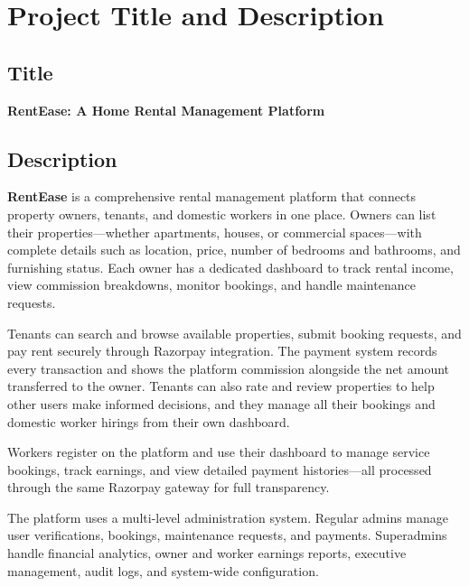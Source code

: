 \documentclass[12pt,a4paper]{article}
\begin{document}
\newpage
\tableofcontents
\newpage

\section{Project Title and Description}

\subsection*{Title}
\begin{tcolorbox}[enhanced, colback=ctxBlue!30!white, colframe=primary,
  arc=4pt, boxrule=1pt, left=10pt, right=10pt, top=8pt, bottom=8pt]
  {\large\bfseries\color{primary} RentEase: A Home Rental Management Platform}
\end{tcolorbox}

\subsection*{Description}

\textbf{RentEase} is a comprehensive rental management platform that connects property owners, tenants, and domestic workers in one place. Owners can list their properties---whether apartments, houses, or commercial spaces---with complete details such as location, price, number of bedrooms and bathrooms, and furnishing status. Each owner has a dedicated dashboard to track rental income, view commission breakdowns, monitor bookings, and handle maintenance requests.

Tenants can search and browse available properties, submit booking requests, and pay rent securely through Razorpay integration. The payment system records every transaction and shows the platform commission alongside the net amount transferred to the owner. Tenants can also rate and review properties to help other users make informed decisions, and they manage all their bookings and domestic worker hirings from their own dashboard.

Workers register on the platform and use their dashboard to manage service bookings, track earnings, and view detailed payment histories---all processed through the same Razorpay gateway for full transparency.

The platform uses a multi-level administration system. Regular admins manage user verifications, bookings, maintenance requests, and payments. Superadmins handle financial analytics, owner and worker earnings reports, executive management, audit logs, and system-wide configuration.
\end{document}
